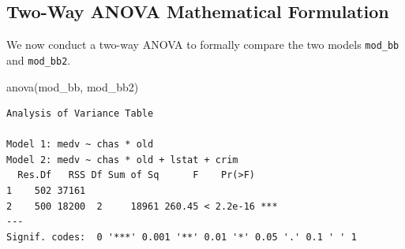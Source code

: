 \documentclass[
  12pt,
  a4paper,
]{scrbook}
\newenvironment{Shaded}{\begin{snugshade}}{\end{snugshade}}
\newcommand{\FunctionTok}[1]{\textcolor[rgb]{0.28,0.35,0.67}{#1}}
\newcommand{\NormalTok}[1]{\textcolor[rgb]{0.00,0.23,0.31}{#1}}
\theoremstyle{plain}
\theoremstyle{definition}
\theoremstyle{remark}
\begin{document}
\subsection{Two-Way ANOVA Mathematical
Formulation}\label{two-way-anova-mathematical-formulation}

We now conduct a two-way ANOVA to formally compare the two models
\texttt{mod\_bb} and \texttt{mod\_bb2}.

\begin{Shaded}
\begin{Highlighting}[]
\FunctionTok{anova}\NormalTok{(mod\_bb, mod\_bb2)}
\end{Highlighting}
\end{Shaded}

\begin{verbatim}
Analysis of Variance Table

Model 1: medv ~ chas * old
Model 2: medv ~ chas * old + lstat + crim
  Res.Df   RSS Df Sum of Sq      F    Pr(>F)    
1    502 37161                                  
2    500 18200  2     18961 260.45 < 2.2e-16 ***
---
Signif. codes:  0 '***' 0.001 '**' 0.01 '*' 0.05 '.' 0.1 ' ' 1
\end{verbatim}
\end{document}
